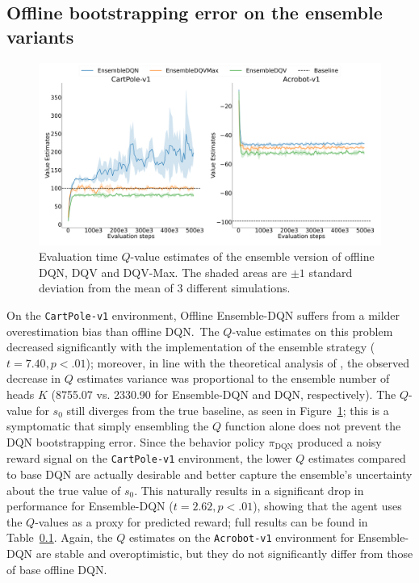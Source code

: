 \subsection{Offline bootstrapping error on the ensemble variants}
\begin{figure}[h]
  \centering
  \includegraphics[width=.5\textwidth]{img/dshift_plots_ensembles_qv.png}
  \caption{Evaluation time $Q$-value estimates of the ensemble version
    of offline DQN, DQV and DQV-Max. The shaded areas are $\pm 1$
    standard deviation from the mean of 3 different
    simulations.}\label{fig:dshift_offline_ensemble}
\end{figure}
On the \texttt{CartPole-v1} environment, Offline Ensemble-DQN suffers
from a milder overestimation bias than offline DQN.\ The $Q$-value
estimates on this problem decreased significantly with the
implementation of the ensemble strategy ($t=7.40,p<.01$); moreover, in
line with the theoretical analysis of \citet{anschel2017averaged}, the
observed decrease in $Q$ estimates variance was proportional to the
ensemble number of heads $K$ (8755.07 vs. 2330.90 for Ensemble-DQN and
DQN, respectively). The $Q$-value for $s_0$ still diverges from the
true baseline, as seen in Figure~\ref{fig:dshift_offline_ensemble};
this is a symptomatic that simply ensembling the $Q$ function alone
does not prevent the DQN bootstrapping error. Since the behavior
policy $\pi_{\textrm{DQN}}$ produced a noisy reward signal on the
\texttt{CartPole-v1} environment, the lower $Q$ estimates compared to
base DQN are actually desirable and better capture the ensemble's
uncertainty about the true value of $s_0$. This naturally results in a
significant drop in performance for Ensemble-DQN ($t=2.62,p<.01$),
showing that the agent uses the $Q$-values as a proxy for predicted
reward; full results can be found in Table~\ref{}. Again, the $Q$
estimates on the \texttt{Acrobot-v1} environment for Ensemble-DQN are
stable and overoptimistic, but they do not significantly differ from
those of base offline DQN.\

